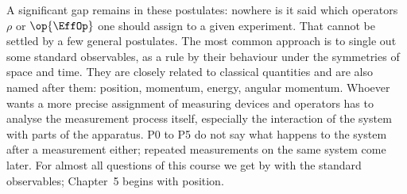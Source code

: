 A significant gap remains in these postulates: nowhere is it said which operators $\rho$ or
$\op{\EffOp}$ one should assign to a given experiment. That cannot be settled by a few general
postulates. The most common approach is to single out some standard observables, as a rule by
their behaviour under the symmetries of space and time. They are closely related to classical
quantities and are also named after them: position, momentum, energy, angular momentum. Whoever
wants a more precise assignment of measuring devices and operators has to analyse the measurement
process itself, especially the interaction of the system with parts of the apparatus. P0 to P5 do
not say what happens to the system after a measurement either; repeated measurements on the same
system come later. For almost all questions of this course we get by with the standard
observables; Chapter~5 begins with position.
